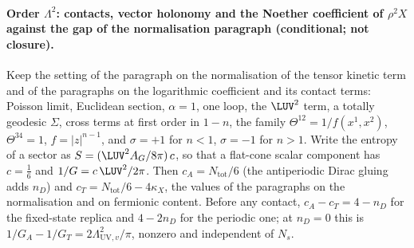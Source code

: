 \paragraph{Order \(\Lambda^2\): contacts, vector holonomy and the Noether coefficient of \(\rho^2X\) against the gap of the normalisation paragraph (conditional; not closure).}
Keep the setting of the paragraph on the normalisation of the tensor kinetic term and of the paragraphs on the logarithmic coefficient and its contact terms: Poisson limit, Euclidean section, \(\alpha=1\), one loop, the \(\LUV^2\) term, a totally geodesic \(\Sigma\), cross terms at first order in \(1-n\), the family \(\Theta^{12}=1/f(x^1,x^2)\), \(\Theta^{34}=1\), \(f=\lvert z\rvert^{n-1}\), and \(\sigma=+1\) for \(n<1\), \(\sigma=-1\) for \(n>1\). Write the entropy of a sector as \(S=(\LUV^2A_G/8\pi)\,c\), so that a flat-cone scalar component has \(c=\tfrac16\) and \(1/G=c\,\LUV^2/2\pi\). Then \(c_A=N_{\mathrm{tot}}/6\) (the antiperiodic Dirac gluing adds \(n_D\)) and \(c_T=N_{\mathrm{tot}}/6-4\kappa_X\), the values of the paragraphs on the normalisation and on fermionic content. Before any contact, \(c_A-c_T=4-n_D\) for the fixed-state replica and \(4-2n_D\) for the periodic one; at \(n_D=0\) this is \(1/G_A-1/G_T=2\Lambda_{\mathrm{UV},v}^2/\pi\), nonzero and independent of \(N_s\).

